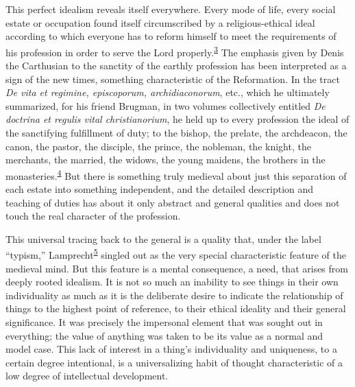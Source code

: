 This perfect idealism reveals itself everywhere. Every mode of life,
every social estate or occupation found itself circumscribed by a
religious-ethical ideal according to which everyone has to reform
himself to meet the requirements of his profession in order to serve the
Lord
properly.\textsuperscript{\protect\hypertarget{17_Chapter_Ten__THE_FAILURE_OF_IMAG.xhtmlux5cux23id_730}{\protect\hyperlink{23_NOTES.xhtmlux5cux23id_731}{3}}}
The emphasis given by Denis the Carthusian to the sanctity of the
earthly profession has been interpreted as a sign of the new times,
something characteristic of the Reformation. In the tract \emph{De vita
et regimine, episcoporum, archidiaconorum}, etc., which he ultimately
summarized, for his friend Brugman, in two volumes collectively entitled
\emph{De doctrina et regulis vital christianorium}, he held up to every
profession the ideal of the sanctifying fulfillment of duty; to the
bishop, the prelate, the archdeacon, the canon, the pastor, the
disciple, the prince, the nobleman, the knight, the merchants, the
married, the widows, the young maidens, the brothers in the
monasteries.\textsuperscript{\protect\hypertarget{17_Chapter_Ten__THE_FAILURE_OF_IMAG.xhtmlux5cux23id_728}{\protect\hyperlink{23_NOTES.xhtmlux5cux23id_729}{4}}}
But there is something truly medieval about just this separation of each
estate into something independent, and the detailed description and
teaching of duties has about it only abstract and general qualities and
does not touch the real character of the profession.

This universal tracing back to the general is a quality that, under the
label ``typism,''
Lamprecht\textsuperscript{\protect\hypertarget{17_Chapter_Ten__THE_FAILURE_OF_IMAG.xhtmlux5cux23id_726}{\protect\hyperlink{23_NOTES.xhtmlux5cux23id_727}{5}}}
singled out as the very special characteristic feature of the medieval
mind. But this feature is a mental consequence, a need, that arises from
deeply rooted idealism. It is not so much an inability to see things in
their own individuality as much as it is the deliberate desire to
indicate the relationship of things to the highest point of reference,
to their ethical ideality and their general significance. It was
precisely the impersonal element that was sought out in everything; the
value of anything was taken to be its value as a normal and model case.
This lack of interest in
\protect\hypertarget{17_Chapter_Ten__THE_FAILURE_OF_IMAG.xhtmlux5cux23page_251}{}{}a
thing's individuality and uniqueness, to a certain degree intentional,
is a universalizing habit of thought characteristic of a low degree of
intellectual development.

